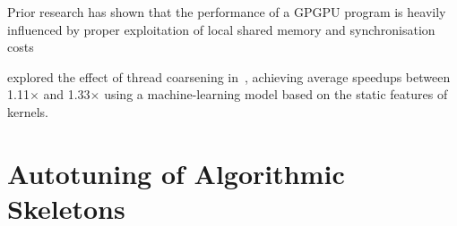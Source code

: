 Prior research has shown that the performance of a GPGPU program is
heavily influenced by proper exploitation of local shared memory and
synchronisation costs~\cite{Ryoo2008a, Lee2010} 




\citeauthor{Magni2014} explored the effect of thread coarsening
in~\cite{Magni2014}, achieving average speedups between 1.11$\times$
and 1.33$\times$ using a machine-learning model based on the static
features of kernels.



\section{Autotuning of Algorithmic Skeletons}


